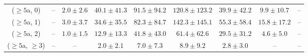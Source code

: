 \begin{table}[h!]
{\begin{tabular}{ccccccccc}
	($\ge5$a, 0) & -- & $2.0\pm 2.6$ & $40.1\pm 41.3$ & $91.5\pm 94.2$ & $120.8\pm 123.2$ & $39.9\pm 42.2$ & $9.9\pm 10.7$ & -- \\[0.5ex] 
	($\ge5$a, 1) & -- & $3.0\pm 3.7$ & $34.6\pm 35.5$ & $82.3\pm 84.7$ & $142.3\pm 145.1$ & $55.3\pm 58.4$ & $15.8\pm 17.2$ & -- \\[0.5ex] 
	($\ge5$a, 2) & -- & $1.0\pm 1.5$ & $12.9\pm 13.3$ & $41.8\pm 43.0$ & $61.4\pm 62.6$ & $29.5\pm 31.2$ & $4.6\pm 5.0$ & -- \\[0.5ex] 
	($\ge5$a, $\ge3$) & -- & -- & $2.0\pm 2.1$ & $7.0\pm 7.3$ & $8.9\pm 9.2$ & $2.8\pm 3.0$ & -- & -- \\[0.5ex] 
	\hline
	\hline
\end{tabular}}
\end{table}
